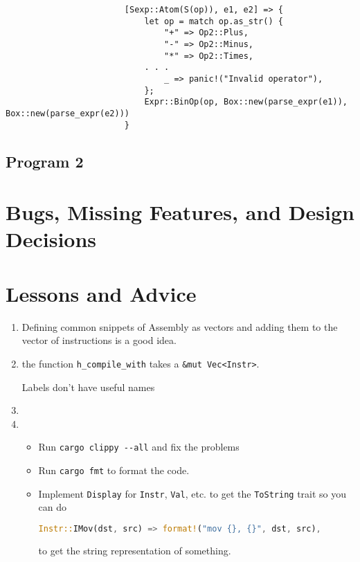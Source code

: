 \begin{enumerate}
\begin{itemize}
					\begin{lstlisting}
						[Sexp::Atom(S(op)), e1, e2] => {
						    let op = match op.as_str() {
						        "+" => Op2::Plus,
						        "-" => Op2::Minus,
						        "*" => Op2::Times,
							. . .
						        _ => panic!("Invalid operator"),
						    };
						    Expr::BinOp(op, Box::new(parse_expr(e1)), Box::new(parse_expr(e2)))
						}
					\end{lstlisting}
			\end{itemize}
	\end{enumerate}

	\subsection{Program 2}

	\section{Bugs, Missing Features, and Design Decisions}

	\section{Lessons and Advice}

	\begin{enumerate}
		\item Defining common snippets of Assembly as vectors and adding them to the vector of instructions is a good idea.
		\item the function \verb|h_compile_with| takes a \verb|&mut Vec<Instr>|.

			Labels don't have useful names

		\item
		\item 
			\begin{itemize}
				\item Run \verb|cargo clippy --all| and fix the problems
				\item Run \verb|cargo fmt| to format the code.
				\item Implement \verb|Display| for \verb|Instr|, \verb|Val|, etc. to get the \verb|ToString| trait so you can do
					\begin{lstlisting}[language=Rust, numbers=none, frame=none]
        					Instr::IMov(dst, src) => format!("mov {}, {}", dst, src),
					\end{lstlisting}
					to get the string representation of something.
			\end{itemize}

	\end{enumerate}


